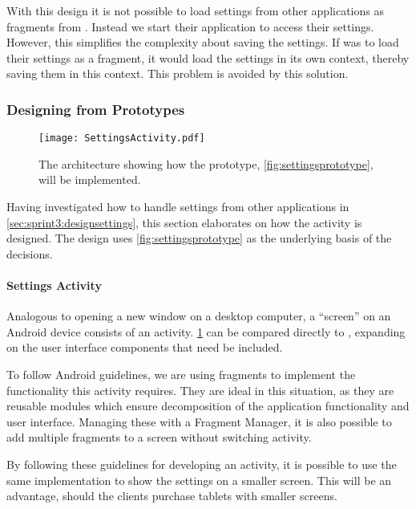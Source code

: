 With this design it is not possible to load settings from other applications as fragments from \launcher. 
Instead we start their application to access their settings.
However, this simplifies the complexity about saving the settings.
If \launcher was to load their settings as a fragment, it would load the settings in its own context, thereby saving them in this context.
This problem is avoided by this solution.

\subsubsection{Designing from Prototypes}

\begin{figure}[h]
\centering
\texttt{[image: SettingsActivity.pdf]}
\caption{The architecture showing how the prototype, \cref{fig:settingsprototype}, will be implemented.}
\label{fig:settingsarchitecture}
\end{figure}

Having investigated how to handle settings from other \giraf applications in \cref{sec:sprint3:designsettings}, this section elaborates on how the activity is designed.
The design uses \cref{fig:settingsprototype} as the underlying basis of the decisions.

\paragraph{Settings Activity}
Analogous to opening a new window on a desktop computer, a ``screen'' on an Android device consists of an activity.
\cref{fig:settingsarchitecture} can be compared directly to , expanding on the user interface components that need be included.

To follow Android guidelines, we are using fragments\cite{fragments} to implement the functionality this activity requires. 
They are ideal in this situation, as they are reusable modules which ensure decomposition of the application functionality and user interface.
Managing these with a Fragment Manager, it is also possible to add multiple fragments to a screen without switching activity.

By following these guidelines for developing an activity, it is possible to use the same implementation to show the settings on a smaller screen.
This will be an advantage, should the clients purchase tablets with smaller screens.\\

